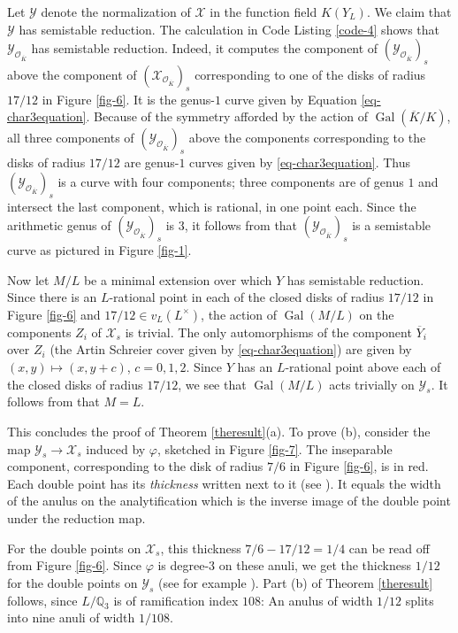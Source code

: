 \documentclass[11pt]{amsart}
\DeclareMathOperator{\Gal}{Gal}
\renewcommand{\phi}{\varphi}
\newcommand{\BQ}{{\mathbb{Q}}}
\newcommand{\CO}{{\mathcal O}}
\newcommand{\CX}{{\mathcal X}}
\newcommand{\CY}{{\mathcal Y}}
\theoremstyle{definition}
\begin{document}
Let $\CY$ denote the normalization of $\CX$ in the function field $K(Y_L)$. We claim that $\CY$ has semistable reduction. The calculation in Code Listing \ref{code-4} shows that $\CY_{\CO_{\overline{K}}}$ has semistable reduction. Indeed, it computes the component of $(\CY_{\CO_{\overline{K}}})_s$ above the component of $(\CX_{\CO_{\overline{K}}})_s$ corresponding to one of the disks of radius $17/12$ in Figure \ref{fig-6}. It is the genus-$1$ curve given by Equation \eqref{eq-char3equation}. Because of the symmetry afforded by the action of $\Gal(\overline{K}/K)$, all three components of $(\CY_{\CO_{\overline{K}}})_s$ above the components corresponding to the disks of radius $17/12$ are genus-$1$ curves given by \eqref{eq-char3equation}. Thus $(\CY_{\CO_{\overline{K}}})_s$ is a curve with four components; three components are of genus $1$ and intersect the last component, which is rational, in one point each. Since the arithmetic genus of $(\CY_{\CO_{\overline{K}}})_s$ is $3$, it follows from \cite[Proposition 7.5.4]{liu} that $(\CY_{\CO_{\overline{K}}})_s$ is a semistable curve as pictured in Figure \ref{fig-1}.

Now let $M/L$ be a minimal extension over which $Y$ has semistable reduction. Since there is an $L$-rational point in each of the closed disks of radius $17/12$ in Figure \ref{fig-6} and $17/12\in v_L(L^\times)$, the action of $\Gal(M/L)$ on the components $Z_i$ of $\CX_s$ is trivial. The only automorphisms of the component $\overline{Y}_i$ over $Z_i$ (the Artin Schreier cover given by \eqref{eq-char3equation}) are given by $(x,y)\mapsto(x,y+c)$, $c=0,1,2$. Since $Y$ has an $L$-rational point above each of the closed disks of radius $17/12$, we see that $\Gal(M/L)$ acts trivially on $\CY_s$. It follows from \cite[Theorem 10.4.44]{liu} that $M=L$.

This concludes the proof of Theorem \ref{theresult}(a). To prove (b), consider the map $\CY_s\to\CX_s$ induced by $\phi$, sketched in Figure \ref{fig-7}. The inseparable component, corresponding to the disk of radius $7/6$ in Figure \ref{fig-6}, is in red. Each double point has its \emph{thickness} written next to it (see \cite[Definition 10.3.23]{liu}). It equals the width of the anulus on the analytification which is the inverse image of the double point under the reduction map.

For the double points on $\CX_s$, this thickness $7/6-17/12=1/4$ can be read off from Figure \ref{fig-6}. Since $\phi$ is degree-$3$ on these anuli, we get the thickness $1/12$ for the double points on $\CY_s$ (see for example \cite[Lemma 3.5.8]{ctt}). Part (b) of Theorem \ref{theresult} follows, since $L/\BQ_3$ is of ramification index $108$: An anulus of width $1/12$ splits into nine anuli of width $1/108$.
\end{document}
